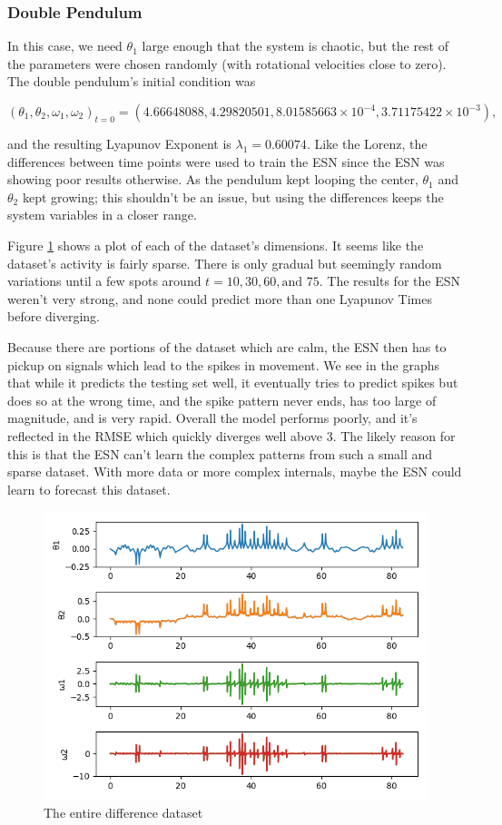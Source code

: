 \documentclass{article}
\begin{document}
\subsubsection{Double Pendulum}

In this case, we need $\theta_1$ large enough that the system is chaotic, but
the rest of the parameters were chosen randomly (with rotational velocities
close to zero). The double pendulum's initial condition was

\begin{equation}
(\theta_1, \theta_2, \omega_1, \omega_2)_{t=0} 
= (4.66648088, 4.29820501,
8.01585663 \times 10^{-4}, 3.71175422 \times 10^{-3}),
\end{equation}

and the resulting Lyapunov Exponent is $\lambda_1 = 0.60074$. Like the
Lorenz, the differences between time points were used to train the ESN since
the ESN was showing poor results otherwise. As the pendulum kept looping the
center, $\theta_1$ and $\theta_2$ kept growing; this shouldn't be an issue,
but using the differences keeps the system variables in a closer range.

Figure \ref{fig:doub_pend_diff} shows a plot of each of the dataset's
dimensions. It seems like the dataset's activity is fairly sparse. There is
only gradual but seemingly random variations until a few spots around
$t=10, 30, 60, \text{and } 75$. The results
for the ESN weren't very strong, and none 
could predict more than one Lyapunov Times before diverging.

Because there are portions of the dataset which are calm, the ESN then has to
pickup on signals which lead to the spikes in movement. We see in the 
graphs that while it predicts the testing set well, it eventually tries to
predict spikes but does so at the wrong time, and the spike pattern never
ends, has too large of magnitude, and is very rapid. Overall the model
performs poorly, and it's reflected in the RMSE which quickly diverges well above 3. The likely reason for this
is that the ESN can't learn the complex patterns from such a small and sparse
dataset. With more data or more complex internals, maybe the ESN could learn 
to forecast this dataset.

\begin{figure}[H]
    \centering
    \includegraphics[width=.5\linewidth]{doc/paper/images/doub_pend/full_differential.png}
    \caption{The entire difference dataset}
    \label{fig:doub_pend_diff}
\end{figure}
\end{document}
